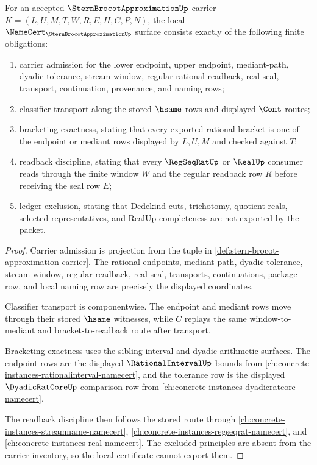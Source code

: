 \begin{theorem}\label{thm:stern-brocot-approximation-namecert-obligations}
For an accepted $\SternBrocotApproximationUp$ carrier $K=(L,U,M,T,W,R,E,H,C,P,N)$, the local $\NameCert_{\SternBrocotApproximationUp}$ surface consists exactly of the following finite obligations:
\begin{enumerate}
\item carrier admission for the lower endpoint, upper endpoint, mediant-path, dyadic tolerance, stream-window, regular-rational readback, real-seal, transport, continuation, provenance, and naming rows;
\item classifier transport along the stored $\hsame$ rows and displayed $\Cont$ routes;
\item bracketing exactness, stating that every exported rational bracket is one of the endpoint or mediant rows displayed by $L,U,M$ and checked against $T$;
\item readback discipline, stating that every $\RegSeqRatUp$ or $\RealUp$ consumer reads through the finite window $W$ and the regular readback row $R$ before receiving the seal row $E$;
\item ledger exclusion, stating that Dedekind cuts, trichotomy, quotient reals, selected representatives, and RealUp completeness are not exported by the packet.
\end{enumerate}
\end{theorem}
\begin{proof}
Carrier admission is projection from the tuple in \autoref{def:stern-brocot-approximation-carrier}. The rational endpoints, mediant path, dyadic tolerance, stream window, regular readback, real seal, transports, continuations, package row, and local naming row are precisely the displayed coordinates.

Classifier transport is componentwise. The endpoint and mediant rows move through their stored $\hsame$ witnesses, while $C$ replays the same window-to-mediant and bracket-to-readback route after transport.

Bracketing exactness uses the sibling interval and dyadic arithmetic surfaces. The endpoint rows are the displayed $\RationalIntervalUp$ bounds from \autoref{ch:concrete-instances-rationalinterval-namecert}, and the tolerance row is the displayed $\DyadicRatCoreUp$ comparison row from \autoref{ch:concrete-instances-dyadicratcore-namecert}.

The readback discipline then follows the stored route through \autoref{ch:concrete-instances-streamname-namecert}, \autoref{ch:concrete-instances-regseqrat-namecert}, and \autoref{ch:concrete-instances-real-namecert}. The excluded principles are absent from the carrier inventory, so the local certificate cannot export them.
\end{proof}

